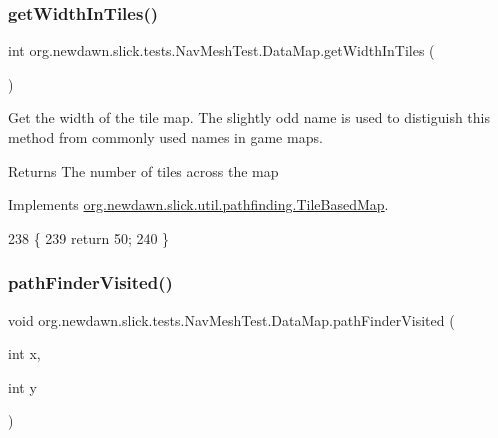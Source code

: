 \subsubsection{\texorpdfstring{get\+Width\+In\+Tiles()}{getWidthInTiles()}}
{\footnotesize\ttfamily int org.\+newdawn.\+slick.\+tests.\+Nav\+Mesh\+Test.\+Data\+Map.\+get\+Width\+In\+Tiles (\begin{DoxyParamCaption}{ }\end{DoxyParamCaption})\hspace{0.3cm}{\ttfamily [inline]}}

Get the width of the tile map. The slightly odd name is used to distiguish this method from commonly used names in game maps.

\begin{DoxyReturn}{Returns}
The number of tiles across the map 
\end{DoxyReturn}


Implements \mbox{\hyperlink{interfaceorg_1_1newdawn_1_1slick_1_1util_1_1pathfinding_1_1_tile_based_map_a5efac540b233405c4ae65b784a7c6d22}{org.\+newdawn.\+slick.\+util.\+pathfinding.\+Tile\+Based\+Map}}.


\begin{DoxyCode}
238                                      \{
239             \textcolor{keywordflow}{return} 50;
240         \}
\end{DoxyCode}
\mbox{\label{classorg_1_1newdawn_1_1slick_1_1tests_1_1_nav_mesh_test_1_1_data_map_af2bca0a48cb72d6e19d4c6e4ffcd6dba}} 
\subsubsection{\texorpdfstring{path\+Finder\+Visited()}{pathFinderVisited()}}
{\footnotesize\ttfamily void org.\+newdawn.\+slick.\+tests.\+Nav\+Mesh\+Test.\+Data\+Map.\+path\+Finder\+Visited (\begin{DoxyParamCaption}\item[{int}]{x,  }\item[{int}]{y }\end{DoxyParamCaption})\hspace{0.3cm}{\ttfamily [inline]}}

